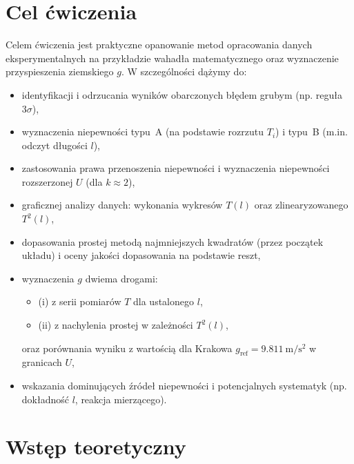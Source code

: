 \documentclass{fizykalab}
\begin{document}
\maketitle

\section{Cel ćwiczenia}

Celem ćwiczenia jest praktyczne opanowanie metod opracowania danych
eksperymentalnych na przykładzie wahadła matematycznego oraz wyznaczenie
przyspieszenia ziemskiego \( g \). W szczególności dążymy do:

\begin{itemize}
  \item identyfikacji i odrzucania wyników obarczonych błędem grubym
    (np. reguła \(3\sigma\)),
  \item wyznaczenia niepewności typu~A (na podstawie rozrzutu \(T_i\))
    i typu~B (m.in. odczyt długości \(l\)),
  \item zastosowania prawa przenoszenia niepewności i wyznaczenia
    niepewności rozszerzonej \(U\) (dla \(k \approx 2\)),
  \item graficznej analizy danych: wykonania wykresów \(T(l)\) oraz
    zlinearyzowanego \(T^2(l)\),
  \item dopasowania prostej metodą najmniejszych kwadratów (przez początek
    układu) i oceny jakości dopasowania na podstawie reszt,
  \item wyznaczenia \( g \) dwiema drogami:
    \begin{itemize}
      \item
        (i) z serii pomiarów \(T\) dla ustalonego \(l\),
      \item
        (ii) z nachylenia prostej w zależności \(T^2(l)\),
    \end{itemize}
    oraz porównania wyniku z wartością dla Krakowa
    \( g_{\text{ref}}=\SI{9.811}{\meter\per\second\squared} \)
    w granicach \(U\),
  \item wskazania dominujących źródeł niepewności i potencjalnych
    systematyk (np. dokładność \(l\), reakcja mierzącego).
\end{itemize}

\pagebreak

\section{Wstęp teoretyczny}
\end{document}
